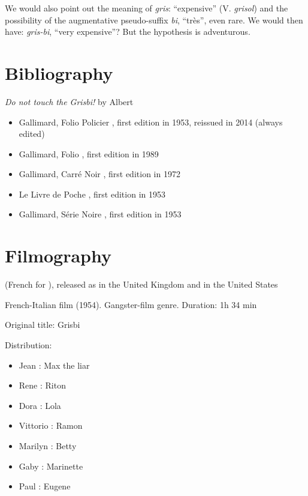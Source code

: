 
We would also point out the meaning of \emph{gris}: ``expensive'' (V. \emph{grisol}) and the possibility of the augmentative pseudo-suffix \emph{bi}, ``très'', even rare. We would then have: \emph{gris-bi}, ``very expensive''? But the hypothesis is adventurous.


\section*{Bibliography\label{preamble-biblio}}

\emph{Do not touch the Grisbi!} by Albert 

\begin{itemize}
\item Gallimard, Folio Policier , first edition in 1953, reissued in 2014 (always edited)
\item Gallimard, Folio , first edition in 1989
\item Gallimard, Carré Noir , first edition in 1972
\item Le Livre de Poche , first edition in 1953
\item Gallimard, Série Noire , first edition in 1953

\end{itemize}

\section*{Filmography\label{preamble-filmography}}

 (French for ), released as  in the United Kingdom and  in the United States

French-Italian film (1954). Gangster-film genre. Duration: 1h 34 min

Original title: Grisbi

Distribution:

\begin{itemize}
    \item Jean : Max the liar
    \item Rene : Riton
    \item Dora : Lola
    \item Vittorio : Ramon
    \item Marilyn : Betty
    \item Gaby : Marinette
    \item Paul : Eugene
\end{itemize}

